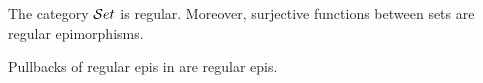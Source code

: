 \documentclass[hott-all.tex]{subfiles}
\begin{document}
% 
% 
\begin{thm}
The category $\mathcal{S}et$ is regular. Moreover, surjective functions between sets are regular epimorphisms.
\end{thm}
% 
% 
\begin{lem}
Pullbacks of regular epis in \uset are regular epis.
\end{lem}
% 
% 
% 
\end{document}

